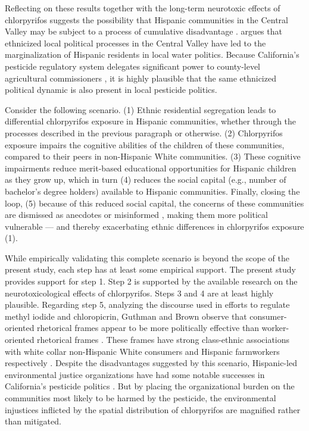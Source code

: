 \documentclass[ijerph,article,submit,oneauthor,pdftex]{Definitions/mdpi}
\begin{document}
Reflecting on these results together with the long-term neurotoxic effects of chlorpyrifos suggests the possibility that Hispanic communities in the Central Valley may be subject to a process of cumulative disadvantage \citep{DiPreteCumulativeAdvantageMechanism2006}. \citet{PannuDrinkingWaterExclusion2012} argues that ethnicized local political processes in the Central Valley have led to the marginalization of Hispanic residents in local water politics. Because California's pesticide regulatory system delegates significant power to county-level agricultural commissioners \citep[p 13]{CaliforniaDepartmentofPesticideRegulationGuidePesticideRegulation2017}, it is highly plausible that the same ethnicized political dynamic is also present in local pesticide politics.

Consider the following scenario. (1) Ethnic residential segregation leads to differential chlorpyrifos exposure in Hispanic communities, whether through the processes described in the previous paragraph or otherwise. (2) Chlorpyrifos exposure impairs the cognitive abilities of the children of these communities, compared to their peers in non-Hispanic White communities. (3) These cognitive impairments reduce merit-based educational opportunities for Hispanic children as they grow up, which in turn (4) reduces the social capital (e.g., number of bachelor's degree holders) available to Hispanic communities. Finally, closing the loop, (5) because of this reduced social capital, the concerns of these communities are dismissed as anecdotes or misinformed \citep{OttingerBucketsResistanceStandards2010}, making them more political vulnerable --- and thereby exacerbating ethnic differences in chlorpyrifos exposure (1).

While empirically validating this complete scenario is beyond the scope of the present study, each step has at least some empirical support. The present study provides support for step 1. Step 2 is supported by the available research on the neurotoxicological effects of chlorpyrifos. Steps 3 and 4 are at least highly plausible. Regarding step 5, analyzing the discourse used in efforts to regulate methyl iodide and chloropicrin, Guthman and Brown observe that consumer-oriented rhetorical frames appear to be more politically effective than worker-oriented rhetorical frames \citep{GuthmanWhoseLifeCounts2015, GuthmanHowMidasLost2017}. These frames have strong class-ethnic associations with white collar non-Hispanic White consumers and Hispanic farmworkers respectively \citep{HarrisonNeoliberalEnvironmentalJustice2014}. Despite the disadvantages suggested by this scenario, Hispanic-led environmental justice organizations have had some notable successes in California's pesticide politics \citetext{\citealp{LondonProblemsPromiseProgress2008},  \citealp[p 216-21]{LievanosUnevenTransformationsEnvironmental2011}, \citealp{HarrisonTakingDifferentTack2017}}. But by placing the organizational burden on the communities most likely to be harmed by the pesticide, the environmental injustices inflicted by the spatial distribution of chlorpyrifos are magnified rather than mitigated.
\end{document}
